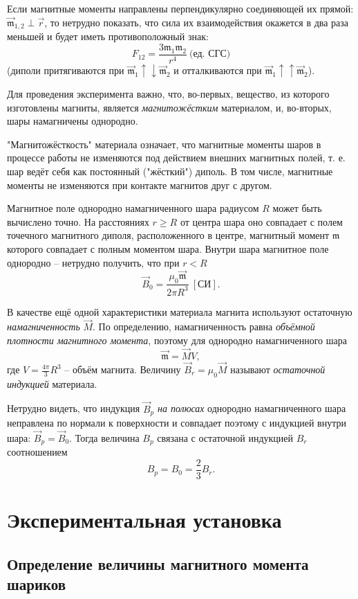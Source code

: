 \documentclass[a4paper,10pt]{article}
\begin{document}
Если магнитные моменты направлены перпендикулярно соединяющей их прямой: $\vec{\mathfrak{m}}_{1,2}\perp\vec{r}$, то нетрудно показать, что сила их взаимодействия окажется в два раза меньшей и будет иметь противоположный знак:\[F_{12}=\frac{3\mathfrak{m}_1\mathfrak{m}_2}{r^4}\ \text{(ед. СГС)}\](диполи притягиваются при $\vec{\mathfrak{m}}_1\uparrow\downarrow\vec{\mathfrak{m}}_2$ и отталкиваются при $\vec{\mathfrak{m}}_1\uparrow\uparrow\vec{\mathfrak{m}}_2$).

Для проведения эксперимента важно, что, во-первых, вещество, из которого изготовлены магниты, является \textit{магнитожёстким} материалом, и, во-вторых, шары намагничены однородно.

"Магнитожёсткость" материала означает, что магнитные моменты шаров в процессе работы не изменяются под действием внешних магнитных полей, т. е. шар ведёт себя как постоянный ("жёсткий") диполь. В том числе, магнитные моменты не изменяются при контакте магнитов друг с другом.

Магнитное поле однородно намагниченного шара радиусом $R$ может быть вычислено точно. На расстояниях $r\geq R$ от центра шара оно совпадает с полем точечного магнитного диполя, расположенного в центре, магнитный момент $\mathfrak{m}$ которого совпадает с полным моментом шара. Внутри шара магнитное поле однородно -- нетрудно получить, что при $r < R$\[\vec{B}_0=\frac{\mu_0\vec{\mathfrak{m}}}{2\pi R^3}\ \left[\text{СИ}\right].\]

В качестве ещё одной характеристики материала магнита используют остаточную \textit{намагниченность} $\vec{M}$. По определению, намагниченность равна \textit{объёмной плотности магнитного момента}, поэтому для однородно намагниченного шара\[\vec{\mathfrak{m}}=\vec{M}V,\]где $V=\frac{4\pi}{3}R^3$ -- объём магнита. Величину $\vec{B}_r=\mu_0\vec{M}$ называют \textit{остаточной индукцией} материала.

Нетрудно видеть, что индукция $\vec{B}_p$ \textit{на полюсах} однородно намагниченного шара неправлена по нормали к поверхности и совпадает поэтому с индукцией внутри шара: $\vec{B}_p=\vec{B}_0$. Тогда величина $B_p$ связана с остаточной индукцией $B_r$ соотношением\[B_p=B_0=\frac{2}{3}B_r.\]

\section*{Экспериментальная установка}

\subsection*{Определение величины магнитного момента шариков}
\end{document}
